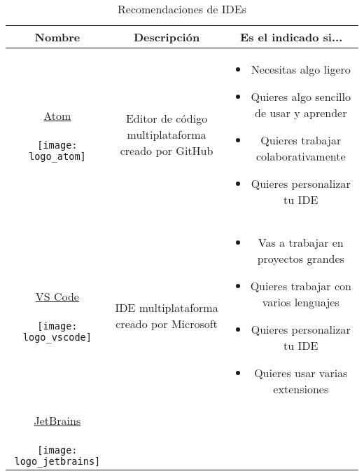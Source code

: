 \documentclass[12pt]{report}
\begin{document}
				\begin{table}[!hbt]
					\caption{Recomendaciones de IDEs}
					\begin{center}
						\begin{tabular}{c c c}
							\textbf{Nombre}	&	\textbf{Descripción}	&	\textbf{Es el indicado si...}\\
							\hline
								\parbox[c]{2cm}{
									\centering
									\href{https://atom.io}{Atom}
									\newline\newline
									\texttt{[image: logo\_atom]}	
								}	
								&
								\parbox[c]{3cm}{
									Editor de código multiplataforma creado por GitHub
								}
								&	
								\parbox[c]{8cm}{
									\begin{itemize}
										\item Necesitas algo ligero
										\item Quieres algo sencillo de usar y aprender
										\item Quieres trabajar colaborativamente
										\item Quieres personalizar tu IDE
									\end{itemize}
								}
								\\\hline
								\parbox[c]{2cm}{
									\centering
									\href{https://code.visualstudio.com/download}{VS Code}
									\newline\newline
									\texttt{[image: logo\_vscode]}	
								}
								&
								\parbox[c]{3cm}{
									IDE multiplataforma creado por Microsoft
								}
								&
								\parbox[c]{8cm}{
									\begin{itemize}
										\item Vas a trabajar en proyectos grandes
										\item Quieres trabajar con varios lenguajes
										\item Quieres personalizar tu IDE
										\item Quieres usar varias extensiones
									\end{itemize}
								}
								\\\hline
								\parbox[c]{2cm}{
									\centering
									\href{https://www.jetbrains.com}{JetBrains}
									\newline\newline
									\texttt{[image: logo\_jetbrains]}	
								}	
								&	
								\parbox[c]{3cm}{
}
\end{tabular}
\end{center}
\end{table}
\end{document}
